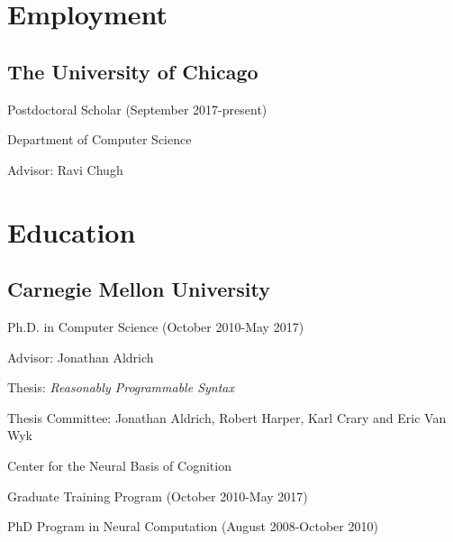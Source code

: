 \documentclass[10pt,letterpaper]{article}
\renewenvironment{itemize}{
  \begin{list}{}{
    \setlength{\leftmargin}{1.25em}
    \setlength{\itemsep}{0.25em}
    \setlength{\parskip}{0pt}
    \setlength{\parsep}{0.2em}
  }
}{
  \end{list}
}
\begin{document}
\section*{Employment}
\subsection*{The University of Chicago}
  \begin{itemize}
    \item Postdoctoral Scholar (September 2017-present)
    \item Department of Computer Science
    \item Advisor: Ravi Chugh
  \end{itemize}


\section*{Education}

\subsection*{Carnegie Mellon University}

\begin{itemize}
  \item Ph.D. in Computer Science (October 2010-May 2017)
    \begin{itemize}
    \item Advisor: Jonathan Aldrich
    \item Thesis: \emph{Reasonably Programmable Syntax}
    \item Thesis Committee: Jonathan Aldrich, Robert Harper, Karl Crary and Eric Van Wyk
    \end{itemize}
  \item Center for the Neural Basis of Cognition
    \begin{itemize}
      \item Graduate Training Program (October 2010-May 2017)
      \item PhD Program in Neural Computation (August 2008-October 2010)
    \end{itemize}
\end{itemize}
\end{document}
